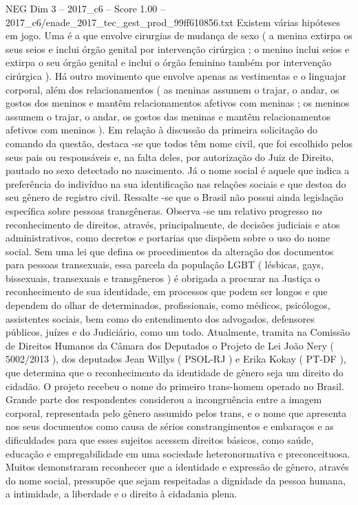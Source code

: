 \begin{textsample}{NEG Dim 3 – 2017\_c6 – Score 1.00 – 2017\_c6/enade\_2017\_tec\_gest\_prod\_99ff610856.txt}
Existem várias hipóteses em jogo.
Uma é a que envolve cirurgias de mudança de sexo ( a menina extirpa os seus seios e inclui órgão genital por intervenção cirúrgica ; o menino inclui seios e extirpa o seu órgão genital e inclui o órgão feminino também por intervenção cirúrgica ).
Há outro movimento que envolve apenas as vestimentas e o linguajar corporal, além dos relacionamentos ( as meninas assumem o trajar, o andar, os gostos dos meninos e mantêm relacionamentos afetivos com meninas ; os meninos assumem o trajar, o andar, os gostos das meninas e mantêm relacionamentos afetivos com meninos ).
Em relação à discussão da primeira solicitação do comando da questão, destaca -se que todos têm nome civil, que foi escolhido pelos seus pais ou responsáveis e, na falta deles, por autorização do Juiz de Direito, pautado no sexo detectado no nascimento.
Já o nome social é aquele que indica a preferência do indivíduo na sua identificação nas relações sociais e que destoa do seu gênero de registro civil.
Ressalte -se que o Brasil não possui ainda legislação específica sobre pessoas transgêneras.
Observa -se um relativo progresso no reconhecimento de direitos, através, principalmente, de decisões judiciais e atos administrativos, como decretos e portarias que dispõem sobre o uso do nome social.
Sem uma lei que defina os procedimentos da alteração dos documentos para pessoas transexuais, essa parcela da população LGBT ( lésbicas, gays, bissexuais, transexuais e transgêneros ) é obrigada a procurar na Justiça o reconhecimento de sua identidade, em processos que podem ser longos e que dependem do olhar de determinados, profissionais, como médicos, psicólogos, assistentes sociais, bem como do entendimento dos advogados, defensores públicos, juízes e do Judiciário, como um todo.
Atualmente, tramita na Comissão de Direitos Humanos da Câmara dos Deputados o Projeto de Lei João Nery ( 5002/2013 ), dos deputados Jean Willys ( PSOL-RJ ) e Erika Kokay ( PT-DF ), que determina que o reconhecimento da identidade de gênero seja um direito do cidadão.
O projeto recebeu o nome do primeiro trans-homem operado no Brasil.
Grande parte dos respondentes considerou a incongruência entre a imagem corporal, representada pelo gênero assumido pelos trans, e o nome que apresenta nos seus documentos como causa de sérios constrangimentos e embaraços e as dificuldades para que esses sujeitos acessem direitos básicos, como saúde, educação e empregabilidade em uma sociedade heteronormativa e preconceituosa.
Muitos demonstraram reconhecer que a identidade e expressão de gênero, através do nome social, pressupõe que sejam respeitadas a dignidade da pessoa humana, a intimidade, a liberdade e o direito à cidadania plena.

\end{textsample}
